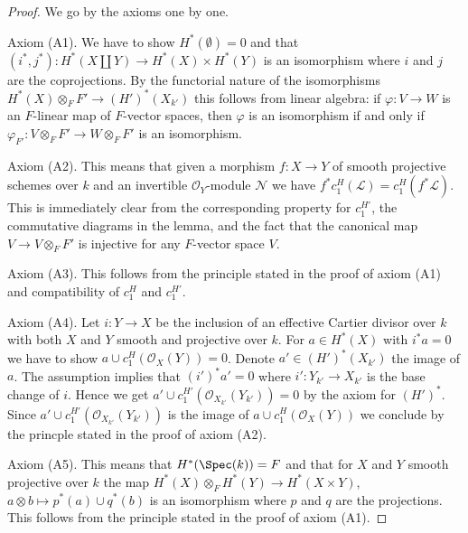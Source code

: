 \begin{proof}
We go by the axioms one by one.

\medskip\noindent
Axiom (A1). We have to show $H^*(\emptyset) = 0$ and that
$(i^*, j^*) : H^*(X \amalg Y) \to H^*(X) \times H^*(Y)$
is an isomorphism where $i$ and $j$ are the coprojections.
By the functorial nature of the isomorphisms
$H^*(X) \otimes_F F' \to (H')^*(X_{k'})$ this
follows from linear algebra: if $\varphi : V \to W$ is an $F$-linear map
of $F$-vector spaces, then $\varphi$ is an isomorphism if and only if
$\varphi_{F'} : V \otimes_F F' \to W \otimes_F F'$ is an isomorphism.

\medskip\noindent
Axiom (A2). This means that given a morphism $f : X \to Y$ of smooth projective
schemes over $k$ and an invertible $\mathcal{O}_Y$-module $\mathcal{N}$
we have $f^*c_1^H(\mathcal{L}) = c_1^H(f^*\mathcal{L})$. This is immediately
clear from the corresponding property for $c_1^{H'}$, the commutative
diagrams in the lemma, and the fact that the canonical map
$V \to V \otimes_F F'$ is injective for any $F$-vector space $V$.

\medskip\noindent
Axiom (A3). This follows from the principle stated in the proof of
axiom (A1) and compatibility of $c_1^H$ and $c_1^{H'}$.

\medskip\noindent
Axiom (A4). Let $i : Y \to X$ be the inclusion of an effective
Cartier divisor over $k$ with both $X$ and $Y$ smooth and projective
over $k$. For $a \in H^*(X)$ with
$i^*a = 0$ we have to show $a \cup c_1^H(\mathcal{O}_X(Y)) = 0$.
Denote $a' \in (H')^*(X_{k'})$ the image of $a$.
The assumption implies that $(i')^*a' = 0$ where $i' : Y_{k'} \to X_{k'}$
is the base change of $i$. Hence we get
$a' \cup c_1^{H'}(\mathcal{O}_{X_{k'}}(Y_{k'})) = 0$ by the axiom
for $(H')^*$. Since $a' \cup c_1^{H'}(\mathcal{O}_{X_{k'}}(Y_{k'}))$
is the image of $a \cup c_1^H(\mathcal{O}_X(Y))$ we conclude by
the princple stated in the proof of axiom (A2).

\medskip\noindent
Axiom (A5). This means that $H^*(\Spec(k)) = F$ and that for $X$ and $Y$ smooth
projective over $k$ the map $H^*(X) \otimes_F H^*(Y) \to H^*(X \times Y)$,
$a \otimes b \mapsto p^*(a) \cup q^*(b)$ is an isomorphism
where $p$ and $q$ are the projections. This follows from the principle
stated in the proof of axiom (A1).


\end{proof}
